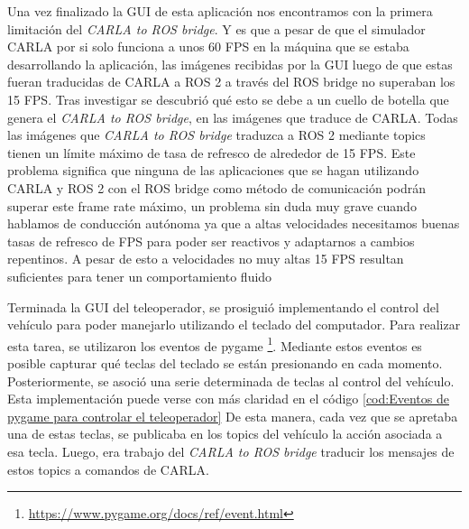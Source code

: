 Una vez finalizado la \ac{GUI} de esta aplicación nos encontramos con la primera limitación del \textit{CARLA to ROS bridge}. Y es que a pesar de que el simulador CARLA por si solo funciona a unos 60 \ac{FPS} en la máquina que se estaba desarrollando la aplicación, las imágenes recibidas por la \ac{GUI} luego de que estas fueran traducidas de CARLA a ROS 2 a través del ROS bridge no superaban los 15 \ac{FPS}. Tras investigar se descubrió qué esto se debe a un cuello de botella que genera el \textit{CARLA to ROS bridge}, en las imágenes que traduce de CARLA. Todas las imágenes que \textit{CARLA to ROS bridge} traduzca a ROS 2 mediante topics tienen un límite máximo de tasa de refresco de alrededor de 15 \ac{FPS}. Este problema significa que ninguna de las aplicaciones que se hagan utilizando CARLA y ROS 2 con el ROS bridge como método de comunicación podrán superar este frame rate máximo, un problema sin duda muy grave cuando hablamos de conducción autónoma ya que a altas velocidades necesitamos buenas tasas de refresco de \ac{FPS} para poder ser reactivos y adaptarnos a cambios repentinos. A pesar de esto a velocidades no muy altas 15 \ac{FPS} resultan suficientes para tener un comportamiento fluido

\bigskip

Terminada la \ac{GUI} del teleoperador, se prosiguió implementando el control del vehículo para poder manejarlo utilizando el teclado del computador. Para realizar esta tarea, se utilizaron los eventos de pygame \footnote{\url{https://www.pygame.org/docs/ref/event.html}}. Mediante estos eventos es posible capturar qué teclas del teclado se están presionando en cada momento. Posteriormente, se asoció una serie determinada de teclas al control del vehículo. Esta implementación puede verse con más claridad en el código \ref{cod:Eventos de pygame para controlar el teleoperador} De esta manera, cada vez que se apretaba una de estas teclas, se publicaba en los topics del vehículo la acción asociada a esa tecla. Luego, era trabajo del \textit{CARLA to ROS bridge} traducir los mensajes de estos topics a comandos de CARLA.


